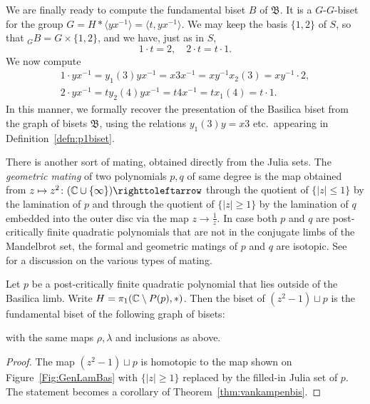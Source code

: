 \documentclass{amsart}
\begin{document}
We are finally ready to compute the fundamental biset $B$ of
$\mathfrak B$. It is a $G$-$G$-biset for the group
$G=H*\langle y x^{-1}\rangle=\langle t,y x^{-1}\rangle$. We may keep the
basis $\{1,2\}$ of $S$, so that ${}_GB=G\times\{1,2\}$, and we have,
just as in $S$,
\[1\cdot t=2,\quad 2\cdot t=t\cdot 1.\]
We now compute
\begin{gather*}
  1\cdot y x^{-1}=y_1(3)y x^{-1}=x3x^{-1}=x y^{-1}x_2(3)=x y^{-1}\cdot 2,\\
  2\cdot y x^{-1}=t y_2(4)y x^{-1}=t4x^{-1}=t x_1(4)=t\cdot 1.
\end{gather*}
In this manner, we formally recover the presentation of the Basilica
biset from the graph of bisets $\mathfrak B$, using the relations
$y_1(3)y=x3$ etc.\ appearing in Definition~\ref{defn:p1biset}.

There is another sort of mating, obtained directly from the Julia
sets. The \emph{geometric mating} of two polynomials $p,q$ of same
degree is the map obtained from
$z\mapsto z^2\colon(\C\cup\{\infty\})\selfmap$ through the quotient of
$\{|z|\le 1\}$ by the lamination of $p$ and through the quotient of
$\{|z|\ge 1\}$ by the lamination of $q$ embedded into the outer disc
via the map $z\to\frac1z$. In case both $p$ and $q$ are
post-critically finite quadratic polynomials that are not in the
conjugate limbs of the Mandelbrot set, the formal and geometric
matings of $p$ and $q$ are isotopic. See~\cite{cheritat:shishikura}
for a discussion on the various types of mating.

\begin{thm}
  Let $p$ be a post-critically finite quadratic polynomial that lies
  outside of the Basilica limb.  Write $H=\pi_1({\mathbb C}\setminus P(p),*)$. Then
  the biset of $(z^2-1)\sqcup p$ is the fundamental biset of the following
  graph of bisets:
\begin{center}
\end{center}
with the same maps $\rho,\lambda$ and inclusions as above.
\end{thm}
\begin{proof}
  The map $(z^2-1)\sqcup p$ is homotopic to the map shown on
  Figure~\ref{Fig:GenLamBas} with $\{|z|\ge 1\}$ replaced by the filled-in
  Julia set of $p$. The statement becomes a corollary of
  Theorem~\ref{thm:vankampenbis}.
\end{proof}

\begin{bibdiv}
\begin{biblist}
\end{biblist}
\end{bibdiv}
\end{document}
